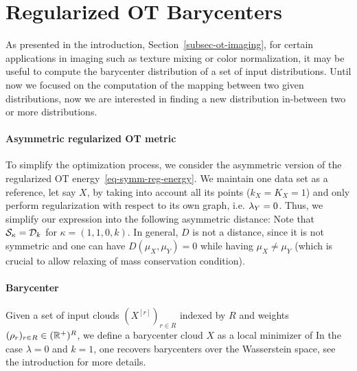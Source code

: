 \section{Regularized OT Barycenters}\label{sec-barycenters}

As presented in the introduction, Section~\ref{subsec-ot-imaging}, for certain applications in imaging such as texture mixing or color normalization, it may be useful to compute the barycenter distribution of a set of input distributions. Until now we focused on the computation of the mapping between two given distributions, now we are interested in finding a new distribution in-between two or more distributions. 


\paragraph{Asymmetric regularized OT metric}

To simplify the optimization process, we consider the asymmetric version of the regularized OT energy~\eqref{eq-symm-reg-energy}. We maintain one data set as a reference, let say $X$, by taking into account all its points ($k_X=K_X=1$) and only perform regularization with respect to its own graph, i.e. $\lambda_Y=0$. Thus, we simplify our expression into the following asymmetric distance: 
Note that $\mathcal{S}_{\kappa}=\mathcal{D}_k$ for $\kappa=(1,1,0,k)$. In general, $D$ is not a distance, since it is not symmetric and one can have $D(\mu_X,\mu_Y)=0$ while having $\mu_X \neq \mu_Y$ (which is crucial to allow relaxing of mass conservation condition).  

\paragraph{Barycenter}Given a set of input clouds $(X^{[r]})_{r \in R}$ indexed by $R$ and weights $(\rho_r)_{r \in R} \in (\mathbb{R}^+)^R$, we define a barycenter cloud $X$ as a local minimizer of 
In the case $\lambda=0$ and $k=1$, one recovers barycenters over the Wasserstein space, see the introduction for more details. 


